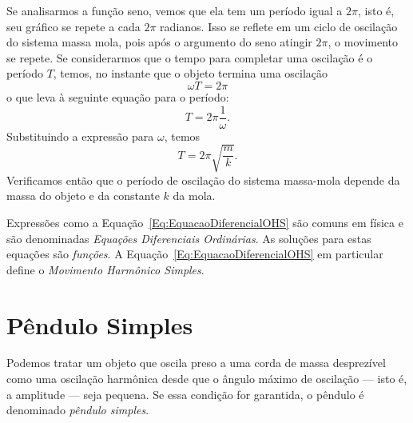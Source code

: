 Se analisarmos a função seno, vemos que ela tem um período igual a $2\pi$, isto é, seu gráfico se repete a cada $2\pi$ radianos. Isso se reflete em um ciclo de oscilação do sistema massa mola, pois após o argumento do seno atingir $2\pi$, o movimento se repete. Se considerarmos que o tempo para completar uma oscilação é o período $T$, temos, no instante que o objeto termina uma oscilação
\begin{equation}
	\omega T = 2\pi
\end{equation}
%
o que leva à seguinte equação para o período:
\begin{equation}
	T = 2\pi \frac{1}{\omega}.
\end{equation}
%
Substituindo a expressão para $\omega$, temos
\begin{equation}
	T = 2\pi \sqrt{\frac{m}{k}}.
\end{equation}
%
Verificamos então que o período de oscilação do sistema massa-mola depende da massa do objeto e da constante $k$ da mola.

Expressões como a Equação~\eqref{Eq:EquacaoDiferencialOHS} são comuns em física e são denominadas \emph{Equações Diferenciais Ordinárias}. As soluções para estas equações são \emph{funções}. A Equação~\eqref{Eq:EquacaoDiferencialOHS} em particular define o \emph{Movimento Harmônico Simples}.

\section{Pêndulo Simples}

Podemos tratar um objeto que oscila preso a uma corda de massa desprezível como uma oscilação harmônica desde que o ângulo máximo de oscilação --- isto é, a amplitude --- seja pequena. Se essa condição for garantida, o pêndulo é denominado \emph{pêndulo simples}.

